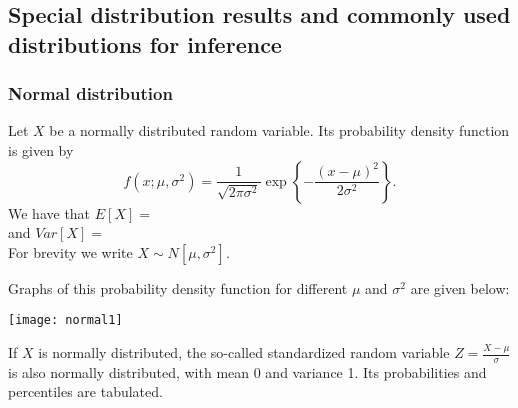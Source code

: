 \documentclass[12pt]{article}
\begin{document}
\subsection{Special distribution results and commonly used distributions for inference}


\subsubsection{Normal distribution}
Let $X$ be a normally distributed random variable. Its probability density function is given by $$f(x;\mu,\sigma^2) = \frac{1}{\sqrt{2\pi\sigma^2}} \exp \left\{ -\frac{(x-\mu)^2}{2\sigma^2} \right\}.$$
We have that $E[X]=$\\[20pt]
and $Var[X]=$\\[20pt]
For brevity we write $X \sim N[\mu,\sigma^2].$

Graphs of this probability density function for different $\mu$ and $\sigma^2$ are given below:
\begin{center}
  \texttt{[image: normal1]}
\end{center}

If $X$ is normally distributed, the so-called standardized random variable $\displaystyle Z=\frac{X-\mu}{\sigma}$ is also normally distributed, with mean 0 and variance 1. Its probabilities and percentiles are tabulated.

\end{document}
